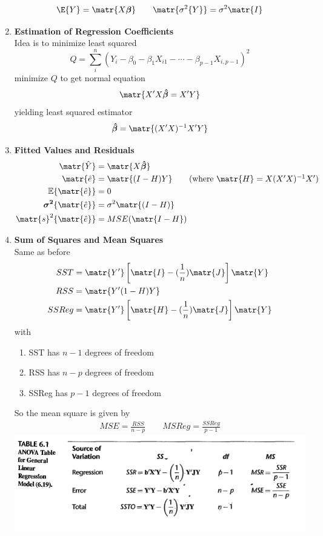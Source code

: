 \documentclass[11pt]{article}
\newcommand{\e}[1]{\mathbb{E} \{#1\}}
\newcommand{\bvar}[1]{\boldsymbol{\sigma^2}\{#1\}}
\newcommand{\bevar}[1]{\matr{s}^2\{#1\}}
\begin{document}
\begin{enumerate}
    \[
        \E\{Y\} =  \matr{X\boldsymbol{\beta}} \quad \quad \matr{\sigma^2\{Y\}} = \sigma^2 \matr{I}
    \]
    \item \textbf{Estimation of Regression Coefficients} \\
    Idea is to minimize least squared 
    \[
        Q = \sum_i^n (Y_i - \beta_0 - \beta_1 X_{i1} - \cdots - \beta_{p-1}X_{i, p-1})^2
    \]
    minimize $Q$ to get normal equation 
    \[
        \matr{X'X\boldsymbol{\hat{\beta}} = X'Y}
    \]
    yielding least squared estimator 
    \[
        \boldsymbol{\hat{\beta}} = \matr{(X'X)^{-1}X'Y}
    \]
    \item \textbf{Fitted Values and Residuals} \\
    \begin{align*}
        \matr{\hat{Y}} &= \matr{X\boldsymbol{\hat{\beta}}} \\ 
        \matr{\hat{e}} &= \matr{(I-H)Y} \tag{where $\matr{H} = X(X'X)^{-1}X'$}  \\
        \e{\matr{\hat{e}}} &= 0 \\ 
        \bvar{\matr{\hat{e}}} &= \sigma^2\matr{(I-H)} \\ 
        \bevar{\matr{\hat{e}}} &= MSE(\matr{I-H}) \\ 
    \end{align*}
    \item \textbf{Sum of Squares and Mean Squares} \\
    Same as before 
    \begin{align*}
        SST &= \matr{Y'}\left[ \matr{I} - (\frac{1}{n})\matr{J} \right]\matr{Y}\\
        RSS &= \matr{Y'(1-H)Y}\\ 
        SSReg &= \matr{Y'}\left[ \matr{H} - (\frac{1}{n})\matr{J} \right]\matr{Y}\\
    \end{align*}
    with 
    \begin{enumerate}
        \item SST has $n-1$ degrees of freedom 
        \item RSS has $n-p$ degrees of freedom 
        \item SSReg has $p-1$ degrees of freedom
    \end{enumerate}
    So the mean square is given by
    \begin{align*}
        MSE = \frac{RSS}{n-p}
        \quad \quad 
        MSReg = \frac{SSReg}{p-1}
    \end{align*}
    \includegraphics[width=\textwidth]{anova_table_for_GLR.png}

\end{enumerate}
\end{document}
